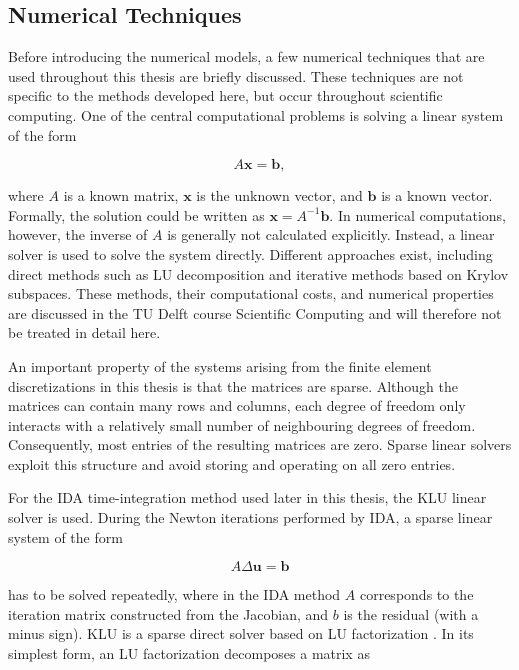 \subsection{Numerical Techniques}\label{subsec:numerical_techniques}

Before introducing the numerical models, a few numerical techniques that are used throughout this thesis are briefly discussed. These techniques are not specific to the methods developed here, but occur throughout scientific computing. One of the central computational problems is solving a linear system of the form

\begin{equation}\label{eq:num_linear_system}
A\mathbf{x} = \mathbf{b},
\end{equation}

where $A$ is a known matrix, $\mathbf{x}$ is the unknown vector, and $\mathbf{b}$ is a known vector. Formally, the solution could be written as $\mathbf{x}=A^{-1}\mathbf{b}$. In numerical computations, however, the inverse of $A$ is generally not calculated explicitly. Instead, a linear solver is used to solve the system directly. Different approaches exist, including direct methods such as LU decomposition and iterative methods based on Krylov subspaces. These methods, their computational costs, and numerical properties are discussed in the TU Delft course Scientific Computing \cite{ScientificComputing} and will therefore not be treated in detail here.

An important property of the systems arising from the finite element discretizations in this thesis is that the matrices are sparse. Although the matrices can contain many rows and columns, each degree of freedom only interacts with a relatively small number of neighbouring degrees of freedom. Consequently, most entries of the resulting matrices are zero. Sparse linear solvers exploit this structure and avoid storing and operating on all zero entries.

For the IDA time-integration method used later in this thesis, the KLU linear solver is used. During the Newton iterations performed by IDA, a sparse linear system of the form

\begin{equation}
A\Delta\mathbf{u}=\mathbf{b}
\end{equation}

has to be solved repeatedly, where in the IDA method $A$ corresponds to the iteration matrix constructed from the Jacobian, and $b$ is the residual (with a minus sign). KLU is a sparse direct solver based on LU factorization \cite{davis2010klu}. In its simplest form, an LU factorization decomposes a matrix as

